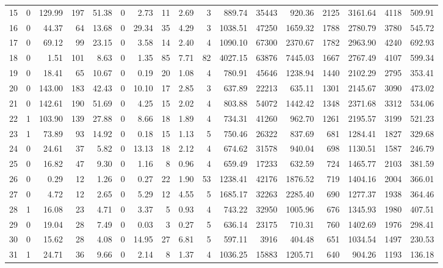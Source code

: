 \begin{table}
\begin{tabular}{lrrrrrrrrrrrrrrrr}
15 & 0 & 129.99 & 197 & 51.38 & 0 & 2.73 & 11 & 2.69 & 3 & 889.74 & 35443 & 920.36 & 2125 & 3161.64 & 4118 & 509.91 \\
16 & 0 & 44.37 & 64 & 13.68 & 0 & 29.34 & 35 & 4.29 & 3 & 1038.51 & 47250 & 1659.32 & 1788 & 2780.79 & 3780 & 545.72 \\
17 & 0 & 69.12 & 99 & 23.15 & 0 & 3.58 & 14 & 2.40 & 4 & 1090.10 & 67300 & 2370.67 & 1782 & 2963.90 & 4240 & 692.93 \\
18 & 0 & 1.51 & 101 & 8.63 & 0 & 1.35 & 85 & 7.71 & 82 & 4027.15 & 63876 & 7445.03 & 1667 & 2767.49 & 4107 & 599.34 \\
19 & 0 & 18.41 & 65 & 10.67 & 0 & 0.19 & 20 & 1.08 & 4 & 780.91 & 45646 & 1238.94 & 1440 & 2102.29 & 2795 & 353.41 \\
20 & 0 & 143.00 & 183 & 42.43 & 0 & 10.10 & 17 & 2.85 & 3 & 637.89 & 22213 & 635.11 & 1301 & 2145.67 & 3090 & 473.02 \\
21 & 0 & 142.61 & 190 & 51.69 & 0 & 4.25 & 15 & 2.02 & 4 & 803.88 & 54072 & 1442.42 & 1348 & 2371.68 & 3312 & 534.06 \\
22 & 1 & 103.90 & 139 & 27.88 & 0 & 8.66 & 18 & 1.89 & 4 & 734.31 & 41260 & 962.70 & 1261 & 2195.57 & 3199 & 521.23 \\
23 & 1 & 73.89 & 93 & 14.92 & 0 & 0.18 & 15 & 1.13 & 5 & 750.46 & 26322 & 837.69 & 681 & 1284.41 & 1827 & 329.68 \\
24 & 0 & 24.61 & 37 & 5.82 & 0 & 13.13 & 18 & 2.12 & 4 & 674.62 & 31578 & 940.04 & 698 & 1130.51 & 1587 & 246.79 \\
25 & 0 & 16.82 & 47 & 9.30 & 0 & 1.16 & 8 & 0.96 & 4 & 659.49 & 17233 & 632.59 & 724 & 1465.77 & 2103 & 381.59 \\
26 & 0 & 0.29 & 12 & 1.26 & 0 & 0.27 & 22 & 1.90 & 53 & 1238.41 & 42176 & 1876.52 & 719 & 1404.16 & 2004 & 366.01 \\
27 & 0 & 4.72 & 12 & 2.65 & 0 & 5.29 & 12 & 4.55 & 5 & 1685.17 & 32263 & 2285.40 & 690 & 1277.37 & 1938 & 364.46 \\
28 & 1 & 16.08 & 23 & 4.71 & 0 & 3.37 & 5 & 0.93 & 4 & 743.22 & 32950 & 1005.96 & 676 & 1345.93 & 1980 & 407.51 \\
29 & 0 & 19.04 & 28 & 7.49 & 0 & 0.03 & 3 & 0.27 & 5 & 636.14 & 23175 & 710.31 & 760 & 1402.69 & 1976 & 298.41 \\
30 & 0 & 15.62 & 28 & 4.08 & 0 & 14.95 & 27 & 6.81 & 5 & 597.11 & 3916 & 404.48 & 651 & 1034.54 & 1497 & 230.53 \\
31 & 1 & 24.71 & 36 & 9.66 & 0 & 2.14 & 8 & 1.37 & 4 & 1036.25 & 15883 & 1205.71 & 640 & 904.26 & 1193 & 136.18 \\

\end{tabular}
\end{table}
